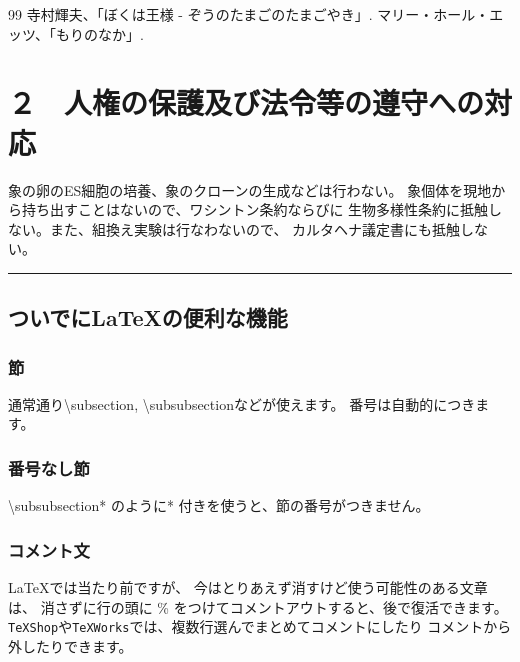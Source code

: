\documentclass[11pt,a4j,dvipdfmx]{jarticle} 					%
\newcommand{\研究課題名}{象の卵}
\newcommand{\研究機関名}{逢坂大学}
\newcommand{\研究代表者氏名}{湯川秀樹}
\newcommand{\研究期間の最終元号年度}{13}  %
\begin{document}
		

\vspace*{1zw}
\begin{thebibliography}{99}
	 寺村輝夫、「ぼくは王様 - ぞうのたまごのたまごやき」.
	 マリー・ホール・エッツ、「もりのなか」.
\end{thebibliography}




\section{２　人権の保護及び法令等の遵守への対応}

	象の卵のES細胞の培養、象のクローンの生成などは行わない。
	象個体を現地から持ち出すことはないので、ワシントン条約ならびに
        生物多様性条約に抵触しない。また、組換え実験は行なわないので、
        カルタヘナ議定書にも抵触しない。

        \noindent
        \rule{\linewidth}{1pt}
        \linenumbers
        \subsection{ついでに\LaTeX の便利な機能}
        \subsubsection{節}
        通常通り\textbackslash subsection, \textbackslash subsubsectionなどが使えます。
        番号は自動的につきます。
        
        \subsubsection*{番号なし節}
        \textbackslash subsubsection* のように* 付きを使うと、節の番号がつきません。
        
        \subsubsection{コメント文}
        \LaTeX では当たり前ですが、
        今はとりあえず消すけど使う可能性のある文章は、
        消さずに行の頭に \% をつけてコメントアウトすると、後で復活できます。
        \texttt{TeXShop}や\texttt{TeXWorks}では、複数行選んでまとめてコメントにしたり
        コメントから外したりできます。
        
\end{document}
